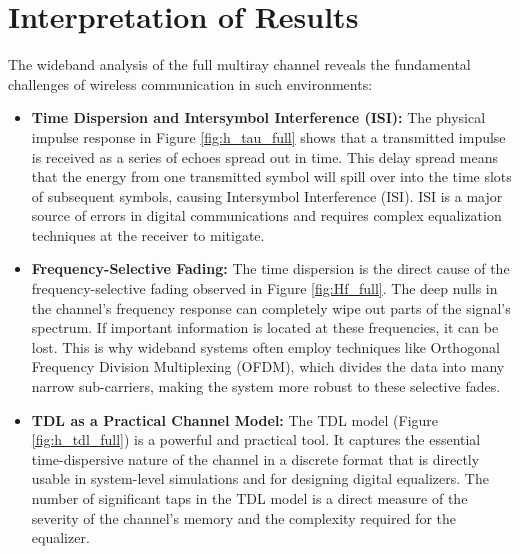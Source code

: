 \section{Interpretation of Results}
The wideband analysis of the full multiray channel reveals the fundamental challenges of wireless communication in such environments:
\begin{itemize}
	\item \textbf{Time Dispersion and Intersymbol Interference (ISI):} The physical impulse response in Figure \ref{fig:h_tau_full} shows that a transmitted impulse is received as a series of echoes spread out in time. This delay spread means that the energy from one transmitted symbol will spill over into the time slots of subsequent symbols, causing Intersymbol Interference (ISI). ISI is a major source of errors in digital communications and requires complex equalization techniques at the receiver to mitigate.
	\item \textbf{Frequency-Selective Fading:} The time dispersion is the direct cause of the frequency-selective fading observed in Figure \ref{fig:Hf_full}. The deep nulls in the channel's frequency response can completely wipe out parts of the signal's spectrum. If important information is located at these frequencies, it can be lost. This is why wideband systems often employ techniques like Orthogonal Frequency Division Multiplexing (OFDM), which divides the data into many narrow sub-carriers, making the system more robust to these selective fades.
	\item \textbf{TDL as a Practical Channel Model:} The TDL model (Figure \ref{fig:h_tdl_full}) is a powerful and practical tool. It captures the essential time-dispersive nature of the channel in a discrete format that is directly usable in system-level simulations and for designing digital equalizers. The number of significant taps in the TDL model is a direct measure of the severity of the channel's memory and the complexity required for the equalizer.
\end{itemize}
